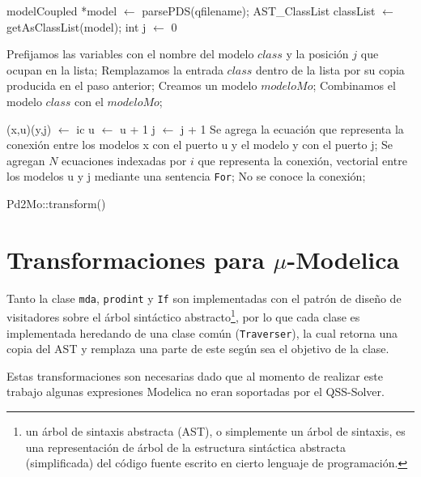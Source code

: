\begin{algorithm}[H]
\begin{algorithmic}[1]
\State modelCoupled *model $\gets$ parsePDS(qfilename);
\State AST\_ClassList classList $\gets$ getAsClassList(model); 
\State int j $\gets$ 0\;

 		\State Prefijamos las variables con el nombre del modelo $class$ y la posición $j$ que ocupan en la lista;
 		\State Remplazamos la entrada $class$ dentro de la lista por su copia producida en el paso anterior;
 	\EndIf
\EndFor
\State Creamos un modelo $modeloMo$;
 	\State Combinamos el modelo $class$ con el $modeloMo$;
\EndFor

	\State (x,u)(y,j) $\gets$ ic
	\State u $\gets$ u + 1
	\State j $\gets$ j + 1
  		\State Se agrega la ecuación que representa la conexión entre los modelos x con el puerto u y el modelo y con el puerto j;
  		\State Se agregan $N$ ecuaciones indexadas por $i$ que representa la conexión, vectorial entre los modelos u y j mediante una sentencia \texttt{For};
  	\Else
  		\State No se conoce la conexión;
	\EndIf
\EndFor
\end{algorithmic}
 \caption{Pd2Mo::transform()}
\end{algorithm}

 
\section{Transformaciones para $\mu$-Modelica} \label{sec:transform}
	Tanto la clase \texttt{mda}, \texttt{prodint} y \texttt{If} son implementadas con el patrón de diseño de visitadores sobre 
	el árbol sintáctico abstracto\footnote{un árbol de sintaxis abstracta (AST), o simplemente un árbol de sintaxis, es una representación 
	de árbol de la estructura sintáctica abstracta (simplificada) del código fuente escrito en cierto lenguaje de programación.}, por lo que 
	cada clase es implementada heredando de una clase común (\texttt{Traverser}), la cual retorna una copia del AST y remplaza una parte de este según sea el 
	objetivo de la clase.
	
	Estas transformaciones son necesarias dado que al momento de realizar este trabajo algunas expresiones Modelica no eran soportadas por el QSS-Solver.
	 
